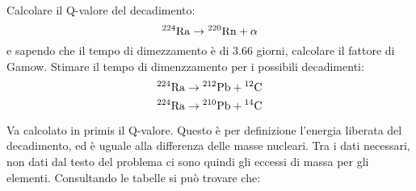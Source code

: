 \documentclass[../main.tex]{subfiles}
\begin{document}
		\begin{ese}[4.1]
			Calcolare il Q-valore del decadimento:
			\[ \mathrm{^{224}Ra}\to\mathrm{^{220}Rn}+\alpha \]
			e sapendo che il tempo di dimezzamento è di 3.66 giorni, calcolare il fattore di Gamow.
			Stimare il tempo di dimenzzamento per i possibili decadimenti:
			\[ \mathrm{^{224}Ra}\to\mathrm{^{212}Pb}+\mathrm{^{12}C} \]
			\[ \mathrm{^{224}Ra}\to\mathrm{^{210}Pb}+\mathrm{^{14}C} \]
		\end{ese}
		\begin{svol}
			Va calcolato in primis il Q-valore. Questo è per definizione l'energia liberata del decadimento, ed è uguale alla differenza delle masse nucleari. Tra i dati necessari, non dati dal testo del problema ci sono quindi gli eccessi di massa per gli elementi. Consultando le tabelle si può trovare che:
			

\end{svol}
\end{document}
